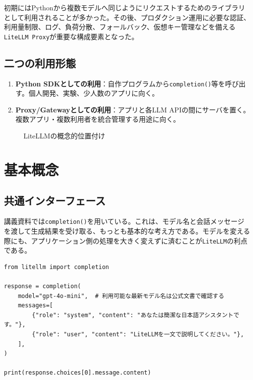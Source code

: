 \documentclass[11pt,a4paper]{bxjsarticle}
\newcommand{\litellm}{\texttt{LiteLLM}}
\begin{document}
初期にはPythonから複数モデルへ同じようにリクエストするためのライブラリとして利用されることが多かった。その後、プロダクション運用に必要な認証、利用量制限、ログ、負荷分散、フォールバック、仮想キー管理などを備える\texttt{LiteLLM Proxy}が重要な構成要素となった。

\subsection{二つの利用形態}
\begin{enumerate}
  \item \textbf{Python SDKとしての利用}：自作プログラムから\texttt{completion()}等を呼び出す。個人開発、実験、少人数のアプリに向く。
  \item \textbf{Proxy/Gatewayとしての利用}：アプリと各LLM APIの間にサーバを置く。複数アプリ・複数利用者を統合管理する用途に向く。
\end{enumerate}

\begin{figure}[H]
\centering
{}
\caption{LiteLLMの概念的位置付け}
\end{figure}

\section{基本概念}
\subsection{共通インターフェース}
講義資料では\texttt{completion()}を用いている。これは、モデル名と会話メッセージを渡して生成結果を受け取る、もっとも基本的な考え方である。モデルを変える際にも、アプリケーション側の処理を大きく変えずに済むことが\litellm{}の利点である。

\begin{lstlisting}[style=python,caption={最小のチャット生成例}]
from litellm import completion

response = completion(
    model="gpt-4o-mini",  # 利用可能な最新モデル名は公式文書で確認する
    messages=[
        {"role": "system", "content": "あなたは簡潔な日本語アシスタントです。"},
        {"role": "user", "content": "LiteLLMを一文で説明してください。"},
    ],
)

print(response.choices[0].message.content)
\end{lstlisting}
\end{document}
